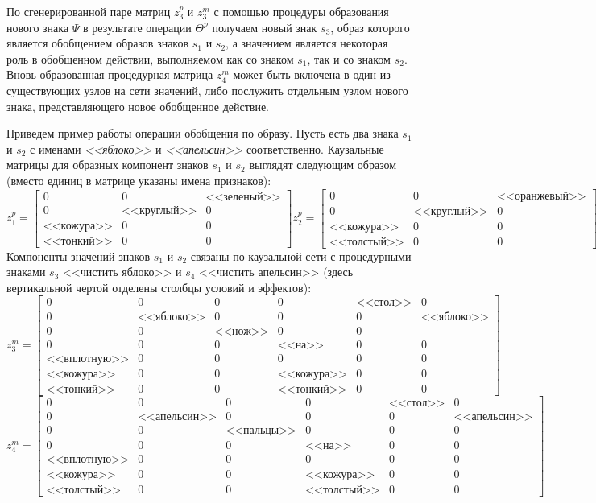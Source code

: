\documentclass[12pt]{scrartcl}
\begin{document}
	По сгенерированной паре матриц $z_3^p$ и $z_3^m$ с помощью процедуры образования нового знака $\Psi$ в результате операции $\Theta^p$ получаем новый знак $s_3$, образ которого является обобщением образов знаков $s_1$ и $s_2$, а значением является некоторая роль в обобщенном действии, выполняемом как со знаком $s_1$, так и со знаком $s_2$. Вновь образованная процедурная матрица $z_4^m$ может быть включена в один из существующих узлов на сети значений, либо послужить отдельным узлом нового знака, представляющего новое обобщенное действие.
	
	Приведем пример работы операции обобщения по образу. Пусть есть два знака $s_1$ и $s_2$ с именами \textit{<<яблоко>>} и \textit{<<апельсин>>} соответственно. Каузальные матрицы для образных компонент знаков $s_1$ и $s_2$ выглядят следующим образом (вместо единиц в матрице указаны имена признаков):
	\[
	z_1^p = \begin{bmatrix}
	0&0& \text{<<зеленый>>} \\
	0& \text{<<круглый>>} &0 \\
	\text{<<кожура>>} &0 &0  \\
	\text{<<тонкий>>} &0 &0
	\end{bmatrix}
	z_2^p = \begin{bmatrix}
	0&0& \text{<<оранжевый>>} \\
	0& \text{<<круглый>>} &0 \\
	\text{<<кожура>>} &0 &0  \\
	\text{<<толстый>>} &0 &0
	\end{bmatrix}
	\]
	Компоненты значений знаков $s_1$ и $s_2$ связаны по каузальной сети с процедурными знаками $s_3$ <<чистить яблоко>> и $s_4$ <<чистить апельсин>> (здесь вертикальной чертой отделены столбцы условий и эффектов):
	\[
	z_3^m= \left[\begin{array}{ccc|cccc}
	0&0&0&0&\text{<<стол>>}&0\\
	0&\text{<<яблоко>>}&0& 0&0&\text{<<яблоко>>}\\
	0&0& \text{<<нож>>} &0 &0\\
	0& 0& 0 &\text{<<на>>} &0&0\\
	\text{<<вплотную>>}& 0& 0 &0 &0&0\\
	\text{<<кожура>>} &0 &0 &\text{<<кожура>>}  &0&0\\
	\text{<<тонкий>>} &0 &0 & \text{<<тонкий>>} &0&0
	\end{array}
	\right]
	\]
	\[
	z_4^m= \left[\begin{array}{ccc|cccc}
	0&0&0&0&\text{<<стол>>}&0\\
	0&\text{<<апельсин>>}&0& 0&0&\text{<<апельсин>>}\\
	0&0& \text{<<пальцы>>} &0 &0&0\\
	0& 0& 0 &\text{<<на>>} &0&0\\
	\text{<<вплотную>>}& 0& 0 &0 &0&0\\
	\text{<<кожура>>} &0 &0 &\text{<<кожура>>}  &0&0\\
	\text{<<толстый>>} &0 &0 & \text{<<толстый>>} &0&0
	\end{array}
	\right]
	\] 
\end{document}
